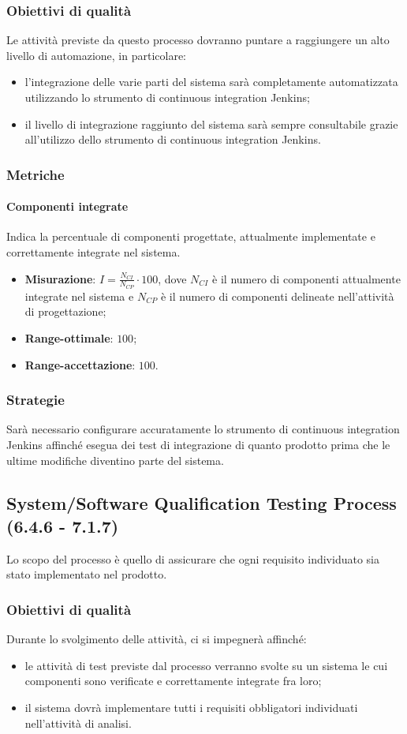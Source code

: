 \subsubsection{Obiettivi di qualità}
Le attività previste da questo processo dovranno puntare a raggiungere un alto livello di automazione, in particolare:
\begin{itemize}
\item l'integrazione delle varie parti del sistema sarà completamente automatizzata utilizzando lo strumento di continuous integration Jenkins;
\item il livello di integrazione raggiunto del sistema sarà sempre consultabile grazie all'utilizzo dello strumento di continuous integration Jenkins.
\end{itemize}
\subsubsection{Metriche}
\paragraph{Componenti integrate}
\label{compInt}
Indica la percentuale di componenti progettate, attualmente implementate e correttamente integrate nel sistema.
\begin{itemize}
\item \textbf{Misurazione}: $I=\frac{N_{CI}}{N_{CP}} \cdot 100$, dove $N_{CI}$ è il numero di componenti attualmente integrate nel sistema e $N_{CP}$ è il numero di componenti delineate nell'attività di progettazione;
\item \textbf{Range-ottimale}: $100$;
\item \textbf{Range-accettazione}: $100$.
\end{itemize}
\subsubsection{Strategie}
Sarà necessario configurare accuratamente lo strumento di continuous integration Jenkins affinché esegua dei test di integrazione di quanto prodotto prima che le ultime modifiche diventino parte del sistema.
\subsection{System/Software Qualification Testing Process (6.4.6 - 7.1.7)}
\label{sySoQualTest}
Lo scopo del processo è quello di assicurare che ogni requisito individuato sia stato implementato nel prodotto.
\subsubsection{Obiettivi di qualità}
Durante lo svolgimento delle attività, ci si impegnerà affinché:
\begin{itemize}
\item le attività di test previste dal processo verranno svolte su un sistema le cui componenti sono verificate e correttamente integrate fra loro;
\item il sistema dovrà implementare tutti i requisiti obbligatori individuati nell'attività di analisi.
\end{itemize}
